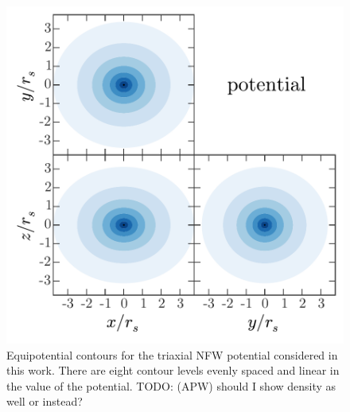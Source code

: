 \documentclass[letterpaper,12pt,preprint]{aastex}
\newcommand{\todo}[2]{{\color{red} TODO: (\MakeUppercase{#1}) #2}}
\begin{document}
\begin{figure}[!p]
\begin{center}
\includegraphics[width=\textwidth]{figures/potential.pdf}
\caption{Equipotential contours for the triaxial NFW potential considered in this work. There are eight contour levels evenly spaced and linear in the value of the potential. \todo{apw}{should I show density as well or instead?}} \label{fig:potential}
\end{center}
\end{figure}
\end{document}
